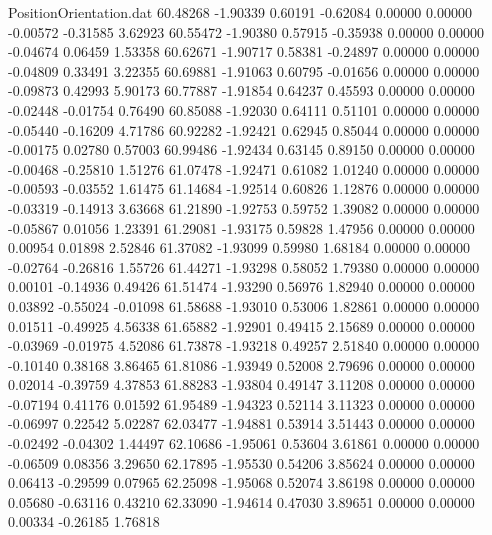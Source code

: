 \begin{filecontents}{PositionOrientation.dat}
  60.48268   -1.90339    0.60191    -0.62084    0.00000    0.00000   -0.00572   -0.31585    3.62923
  60.55472   -1.90380    0.57915    -0.35938    0.00000    0.00000   -0.04674    0.06459    1.53358
  60.62671   -1.90717    0.58381    -0.24897    0.00000    0.00000   -0.04809    0.33491    3.22355
  60.69881   -1.91063    0.60795    -0.01656    0.00000    0.00000   -0.09873    0.42993    5.90173
  60.77887   -1.91854    0.64237     0.45593    0.00000    0.00000   -0.02448   -0.01754    0.76490
  60.85088   -1.92030    0.64111     0.51101    0.00000    0.00000   -0.05440   -0.16209    4.71786
  60.92282   -1.92421    0.62945     0.85044    0.00000    0.00000   -0.00175    0.02780    0.57003
  60.99486   -1.92434    0.63145     0.89150    0.00000    0.00000   -0.00468   -0.25810    1.51276
  61.07478   -1.92471    0.61082     1.01240    0.00000    0.00000   -0.00593   -0.03552    1.61475
  61.14684   -1.92514    0.60826     1.12876    0.00000    0.00000   -0.03319   -0.14913    3.63668
  61.21890   -1.92753    0.59752     1.39082    0.00000    0.00000   -0.05867    0.01056    1.23391
  61.29081   -1.93175    0.59828     1.47956    0.00000    0.00000    0.00954    0.01898    2.52846
  61.37082   -1.93099    0.59980     1.68184    0.00000    0.00000   -0.02764   -0.26816    1.55726
  61.44271   -1.93298    0.58052     1.79380    0.00000    0.00000    0.00101   -0.14936    0.49426
  61.51474   -1.93290    0.56976     1.82940    0.00000    0.00000    0.03892   -0.55024   -0.01098
  61.58688   -1.93010    0.53006     1.82861    0.00000    0.00000    0.01511   -0.49925    4.56338
  61.65882   -1.92901    0.49415     2.15689    0.00000    0.00000   -0.03969   -0.01975    4.52086
  61.73878   -1.93218    0.49257     2.51840    0.00000    0.00000   -0.10140    0.38168    3.86465
  61.81086   -1.93949    0.52008     2.79696    0.00000    0.00000    0.02014   -0.39759    4.37853
  61.88283   -1.93804    0.49147     3.11208    0.00000    0.00000   -0.07194    0.41176    0.01592
  61.95489   -1.94323    0.52114     3.11323    0.00000    0.00000   -0.06997    0.22542    5.02287
  62.03477   -1.94881    0.53914     3.51443    0.00000    0.00000   -0.02492   -0.04302    1.44497
  62.10686   -1.95061    0.53604     3.61861    0.00000    0.00000   -0.06509    0.08356    3.29650
  62.17895   -1.95530    0.54206     3.85624    0.00000    0.00000    0.06413   -0.29599    0.07965
  62.25098   -1.95068    0.52074     3.86198    0.00000    0.00000    0.05680   -0.63116    0.43210
  62.33090   -1.94614    0.47030     3.89651    0.00000    0.00000    0.00334   -0.26185    1.76818

\end{filecontents}
